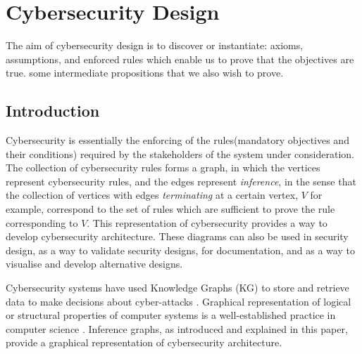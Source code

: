 \chapter{Cybersecurity Design}
The aim of cybersecurity design is to discover or instantiate:
axioms, assumptions, and enforced rules which enable us to
prove that the objectives are true.
some intermediate propositions that we also wish to prove.

\section{Introduction}\label{introsec} \thispagestyle{empty}
Cybersecurity is essentially the enforcing of the rules(mandatory objectives and their conditions) required by the stakeholders of the system under consideration.  The collection of cybersecurity rules forms a graph, in which the vertices represent cybersecurity rules, and the edges represent {\em inference}, in the sense that the collection of vertices with edges {\em terminating} at a certain vertex, $V$ for example, correspond to the set of rules which are sufficient to prove the rule corresponding to $V$. This representation of cybersecurity provides a way to develop cybersecurity architecture\cite{Rerup2018}. These diagrams can also be used in security design, as a way to validate security designs, for documentation, and as a way to visualise and develop alternative designs.

Cybersecurity systems have used Knowledge Graphs (KG) to store and  retrieve data  to make decisions about cyber-attacks 
\iffalse 
We believe that improving the base cyber threat intelligence representation will help improve the overall quality and performance of systems. The dependence of various cybersecurity informatics systems on various knowledge representation schemes makes it imperative that we develop systems that improve these representations. In some cases, a knowledge graph can have incorrect relationships between two cybersecurity entities, or may not even assert a relationship or a few missing relationships. In such a case, we can say that there are a few missing of relationships. we improve knowledge graphs by validating relationships and asserting values for missing relationships \fi \cite{pingle2019relext,jia2018practical, ghose2019multimodal, deng2019knowledge}. Graphical representation of logical or structural properties of computer systems is a well-established practice in computer science \cite{engelen2010integrating}. Inference graphs, as introduced and explained in this paper, provide a graphical representation of cybersecurity architecture.

